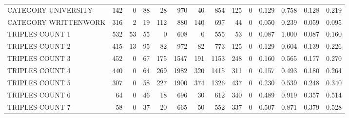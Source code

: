 \begin{tabular}{lrrrrrrrrrllll}
 CATEGORY UNIVERSITY      &             142 &             0 &              88 &              28 &             970 &   40 &  854 &  125 &    0 & 0.129 & 0.758 & 0.128 & 0.219 \\
 CATEGORY WRITTENWORK     &             316 &             2 &              19 &             112 &             880 &  140 &  697 &   44 &    0 & 0.050 & 0.239 & 0.059 & 0.095 \\
 TRIPLES COUNT 1          &             532 &            53 &              55 &               0 &             608 &    0 &  555 &   53 &    0 & 0.087 & 1.000 & 0.087 & 0.160 \\
 TRIPLES COUNT 2          &             415 &            13 &              95 &              82 &             972 &   82 &  773 &  125 &    0 & 0.129 & 0.604 & 0.139 & 0.226 \\
 TRIPLES COUNT 3          &             452 &             0 &              67 &             175 &            1547 &  191 & 1153 &  248 &    0 & 0.160 & 0.565 & 0.177 & 0.270 \\
 TRIPLES COUNT 4          &             440 &             0 &              64 &             269 &            1982 &  320 & 1415 &  311 &    0 & 0.157 & 0.493 & 0.180 & 0.264 \\
 TRIPLES COUNT 5          &             307 &             0 &              58 &             227 &            1900 &  374 & 1326 &  437 &    0 & 0.230 & 0.539 & 0.248 & 0.340 \\
 TRIPLES COUNT 6          &              64 &             0 &              46 &              18 &             696 &   30 &  612 &  340 &    0 & 0.489 & 0.919 & 0.357 & 0.514 \\
 TRIPLES COUNT 7          &              58 &             0 &              37 &              20 &             665 &   50 &  552 &  337 &    0 & 0.507 & 0.871 & 0.379 & 0.528 \\
\hline
\end{tabular}